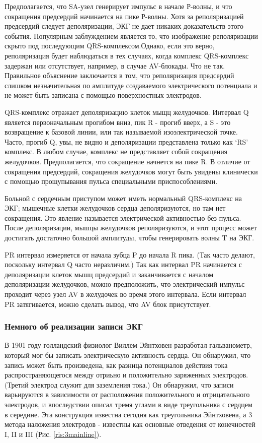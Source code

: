 Предполагается, что SA-узел генерирует импульс в начале Р-волны, и что сокращения предсердий начинается на пике Р-волны. Хотя за реполяризацией предсердий следует деполяризации, ЭКГ не дает никаких доказательств этого события. Популярным заблуждением является то, что изображение реполяризации скрыто под последующим QRS-комплексом.Однако, если это верно, реполяризация будет наблюдаться в тех случаях, когда комплекс QRS-комплекс задержан или отсутствует, например, в случае AV-блокады. Что не так. Правильное объяснение заключается в том, что реполяризация предсердий  слишком незначительная по амплитуде создаваемого электрического потенциала и не может быть записана с помощью поверхностных электродов.

QRS-комплекс отражает деполяризацию клеток мыщц желудочков. Интервал Q является первоначальным прогибом вниз, пик R - прогиб вверх, а S - это возвращение к базовой линии, или так называемой изоэлектрической точке. Часто, прогиб Q, увы, не видно и деполяризации представлена только как ‘RS’ комплекс. В любом случае, комплекс не
представляет собой сокращения желудочков. Предполагается, что сокращение начнется на пике R. В отличие от сокращения предсердий, сокращения желудочков могут быть увидены клинически с помощью прощупывания пульса специальными приспособлениями.

Больной с сердечным приступом может иметь нормальный QRS-комплекс на ЭКГ; мышечные клетки желудочков сердца деполяризуются, но там нет сокращения. Это явление называется электрической активностью без пульса. После деполяризации, мышцы желудочков реполяризуются, и этот процесс может достигать достаточно большой амплитуды, чтобы генерировать волны T на ЭКГ. 

PR интервал измеряется от начала зубца P до начала R пика. (Так часто делают, поскольку интервал Q часто неразличим.) Так как интервал PR начинается с деполяризации клеток мышц предсердий и заканчивается с началом деполяризации желудочков, можно предположить, что электрический импульс проходит через узел AV в желудочек во время этого интервала. Если интервал PR затягивается, можно сделать вывод, что AV блок присутствует.

\subsubsection{Немного об реализации записи ЭКГ}

В 1901 году голландский физиолог Виллем Эйнтховен разработал гальванометр, который мог бы записать электрическую активность сердца. Он обнаружил, что запись может быть произведена, как разница потенциалов действия  тока распространяющегося между отриьно и положительно заряженных электродов. (Третий электрод служит для заземления тока.) Он обнаружил, что записи варьируются в зависимости от расположения положительного и отрицательного электродов, и впоследствии описал тремя углами в виде треугольника с сердцем в середине. Эта конструкция известна сегодня как треугольника Эйнтховена, а 3 метода наложения электродов - известны как основные отведения от конечностей I, II и III (Рис. \ref{ris:3mainline}).


